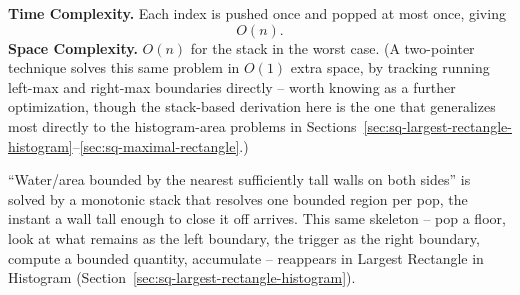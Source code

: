 \begin{complexitybox}
\textbf{Time Complexity.} Each index is pushed once and popped at most
once, giving
\[
  O(n).
\]
\textbf{Space Complexity.} $O(n)$ for the stack in the worst case. (A
two-pointer technique solves this same problem in $O(1)$ extra space, by
tracking running left-max and right-max boundaries directly -- worth
knowing as a further optimization, though the stack-based derivation here
is the one that generalizes most directly to the histogram-area problems
in Sections~\ref{sec:sq-largest-rectangle-histogram}--\ref{sec:sq-maximal-rectangle}.)
\end{complexitybox}

\begin{takeawaybox}
``Water/area bounded by the nearest sufficiently tall walls on both
sides'' is solved by a monotonic stack that resolves one bounded region
per pop, the instant a wall tall enough to close it off arrives. This same
skeleton -- pop a floor, look at what remains as the left boundary, the
trigger as the right boundary, compute a bounded quantity, accumulate --
reappears in Largest Rectangle in Histogram
(Section~\ref{sec:sq-largest-rectangle-histogram}).
\end{takeawaybox}

